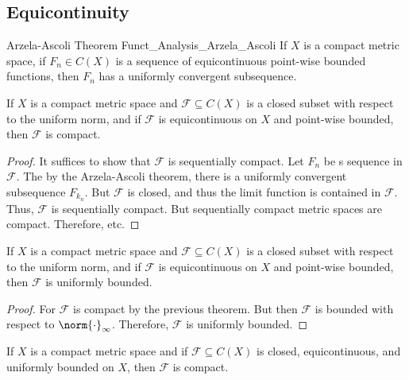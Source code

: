         \subsection{Equicontinuity}
            \begin{ltheorem}{Arzela-Ascoli Theorem}
                  {Funct_Analysis_Arzela_Ascoli}
                If $X$ is a compact metric space, if
                $F_{n}\in{C}(X)$ is a sequence of equicontinuous
                point-wise bounded functions, then $F_{n}$ has a
                uniformly convergent subsequence.
            \end{ltheorem}
            \begin{theorem}
                If $X$ is a compact metric space and
                $\mathscr{F}\subseteq{C}(X)$ is a closed subset with
                respect to the uniform norm, and if
                $\mathscr{F}$ is equicontinuous on $X$ and point-wise
                bounded, then $\mathscr{F}$ is compact.
            \end{theorem}
            \begin{proof}
                It suffices to show that $\mathscr{F}$ is sequentially
                compact. Let $F_{n}$ be s sequence in $\mathscr{F}$.
                The by the Arzela-Ascoli theorem, there is a uniformly
                convergent subsequence $F_{k_{n}}$. But $\mathscr{F}$
                is closed, and thus the limit function is contained
                in $\mathscr{F}$. Thus, $\mathscr{F}$ is sequentially
                compact. But sequentially compact metric spaces are
                compact. Therefore, etc.
            \end{proof}
            \begin{theorem}
                If $X$ is a compact metric space and
                $\mathscr{F}\subseteq{C}(X)$ is a closed subset with
                respect to the uniform norm, and if
                $\mathscr{F}$ is equicontinuous on $X$ and point-wise
                bounded, then $\mathscr{F}$ is uniformly bounded.
            \end{theorem}
            \begin{proof}
                For $\mathscr{F}$ is compact by the previous theorem.
                But then $\mathscr{F}$ is bounded with respect to
                $\norm{\cdot}_{\infty}$. Therefore, $\mathscr{F}$ is
                uniformly bounded.
            \end{proof}
            \begin{theorem}
                If $X$ is a compact metric space and if
                $\mathscr{F}\subseteq{C}(X)$ is closed, equicontinuous,
                and uniformly bounded on $X$, then $\mathscr{F}$ is
                compact.
            \end{theorem}
